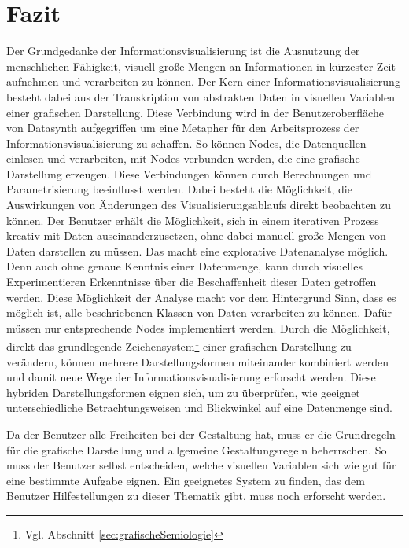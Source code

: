 \documentclass[a4paper, 12pt, DIV=calc, version=first, pdftex, headsepline, footsepline, bibtotocnumbered, liststotocnumbered]{scrreprt}
\begin{document}
\section{Fazit}
\label{sec:Fazit}
Der Grundgedanke der Informationsvisualisierung ist die Ausnutzung
der menschlichen Fähigkeit, visuell große Mengen an Informationen in kürzester Zeit
aufnehmen und verarbeiten zu können. Der Kern einer Informationsvisualisierung
besteht dabei aus der Transkription von abstrakten Daten in visuellen Variablen einer
grafischen Darstellung. Diese Verbindung wird in der Benutzeroberfläche
von Datasynth aufgegriffen um eine Metapher für den Arbeitsprozess der Informationsvisualisierung
zu schaffen. So können Nodes, die Datenquellen einlesen und verarbeiten, mit Nodes verbunden werden, die eine grafische
Darstellung erzeugen. Diese Verbindungen können durch Berechnungen und Parametrisierung beeinflusst werden.
Dabei besteht die Möglichkeit, die Auswirkungen von Änderungen des Visualisierungsablaufs direkt beobachten zu können.
Der Benutzer erhält die Möglichkeit, sich in einem iterativen
Prozess kreativ mit Daten auseinanderzusetzen, ohne dabei manuell
große Mengen von Daten darstellen zu müssen.
Das macht eine explorative Datenanalyse möglich.
Denn auch ohne genaue Kenntnis einer Datenmenge, kann durch visuelles Experimentieren
Erkenntnisse über die Beschaffenheit dieser Daten getroffen werden.
Diese Möglichkeit der Analyse macht vor dem Hintergrund Sinn, dass es
möglich ist, alle beschriebenen Klassen von Daten verarbeiten zu können. Dafür müssen
nur entsprechende Nodes implementiert werden.
Durch die Möglichkeit, direkt das grundlegende Zeichensystem\footnote{Vgl. Abschnitt \ref{sec:grafischeSemiologie}} einer
grafischen Darstellung zu verändern, können mehrere Darstellungsformen
miteinander kombiniert werden und damit neue Wege der Informationsvisualisierung erforscht werden.
Diese hybriden Darstellungsformen eignen sich,
um zu überprüfen, wie geeignet unterschiedliche Betrachtungsweisen und Blickwinkel auf eine Datenmenge sind.

Da der Benutzer alle Freiheiten bei der Gestaltung hat, muss er die
Grundregeln für die grafische Darstellung und allgemeine Gestaltungsregeln beherrschen.
So muss der Benutzer selbst entscheiden, welche visuellen Variablen sich wie 
gut für eine bestimmte Aufgabe eignen. Ein geeignetes System zu finden, das dem
Benutzer Hilfestellungen zu dieser Thematik gibt, muss noch erforscht werden.
\end{document}
